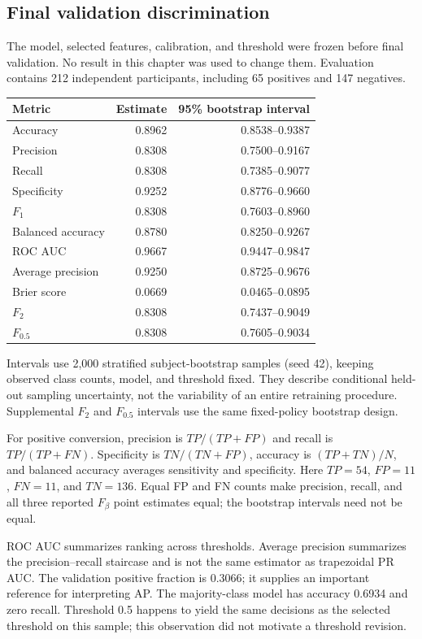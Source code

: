 \documentclass[11pt,a4paper]{article}
\begin{document}
\subsection{Final validation discrimination}
The model, selected features, calibration, and threshold were frozen before final validation. No result in this chapter was used to change them. Evaluation contains 212 independent participants, including 65 positives and 147 negatives.
\begin{center}\small
\begin{tabular}{lrr}\hline
Metric & Estimate & 95\% bootstrap interval\\\hline
Accuracy & 0.8962 & 0.8538--0.9387\\
Precision & 0.8308 & 0.7500--0.9167\\
Recall & 0.8308 & 0.7385--0.9077\\
Specificity & 0.9252 & 0.8776--0.9660\\
$F_1$ & 0.8308 & 0.7603--0.8960\\
Balanced accuracy & 0.8780 & 0.8250--0.9267\\
ROC AUC & 0.9667 & 0.9447--0.9847\\
Average precision & 0.9250 & 0.8725--0.9676\\
Brier score & 0.0669 & 0.0465--0.0895\\
$F_{2}$ & 0.8308 & 0.7437--0.9049\\
$F_{0.5}$ & 0.8308 & 0.7605--0.9034\\
\hline\end{tabular}\end{center}
Intervals use 2,000 stratified subject-bootstrap samples (seed 42), keeping observed class counts, model, and threshold fixed. They describe conditional held-out sampling uncertainty, not the variability of an entire retraining procedure. Supplemental $F_2$ and $F_{0.5}$ intervals use the same fixed-policy bootstrap design.

For positive conversion, precision is $TP/(TP+FP)$ and recall is $TP/(TP+FN)$. Specificity is $TN/(TN+FP)$, accuracy is $(TP+TN)/N$, and balanced accuracy averages sensitivity and specificity. Here $TP=54$, $FP=11$, $FN=11$, and $TN=136$. Equal FP and FN counts make precision, recall, and all three reported $F_\beta$ point estimates equal; the bootstrap intervals need not be equal.

ROC AUC summarizes ranking across thresholds. Average precision summarizes the precision--recall staircase and is not the same estimator as trapezoidal PR AUC. The validation positive fraction is 0.3066; it supplies an important reference for interpreting AP. The majority-class model has accuracy 0.6934 and zero recall. Threshold 0.5 happens to yield the same decisions as the selected threshold on this sample; this observation did not motivate a threshold revision.
\end{document}
